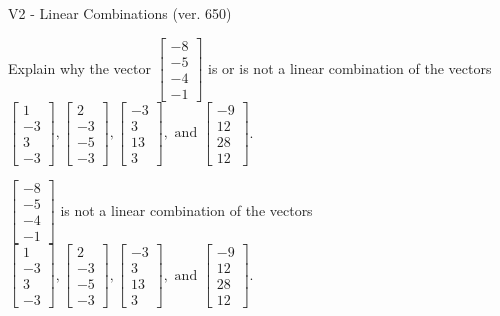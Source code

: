 \begin{exercise}
  \begin{exerciseTitle}V2 - Linear Combinations (ver. 650)\end{exerciseTitle}
  \begin{exerciseStatement}
    Explain why the vector \(\left[\begin{array}{c}
-8 \\
-5 \\
-4 \\
-1
\end{array}\right]\)  is or is not a linear 
	combination of the vectors \(\left[\begin{array}{c}
1 \\
-3 \\
3 \\
-3
\end{array}\right] , \left[\begin{array}{c}
2 \\
-3 \\
-5 \\
-3
\end{array}\right] , \left[\begin{array}{c}
-3 \\
3 \\
13 \\
3
\end{array}\right] , \text{ and } \left[\begin{array}{c}
-9 \\
12 \\
28 \\
12
\end{array}\right]\).
	


  \end{exerciseStatement}
  \begin{exerciseAnswer}
   \(\left[\begin{array}{c}
-8 \\
-5 \\
-4 \\
-1
\end{array}\right]\) 
  	 is not  
	a linear combination of the vectors \(\left[\begin{array}{c}
1 \\
-3 \\
3 \\
-3
\end{array}\right] , \left[\begin{array}{c}
2 \\
-3 \\
-5 \\
-3
\end{array}\right] , \left[\begin{array}{c}
-3 \\
3 \\
13 \\
3
\end{array}\right] , \text{ and } \left[\begin{array}{c}
-9 \\
12 \\
28 \\
12
\end{array}\right]\).


\end{exerciseAnswer}
\end{exercise}
